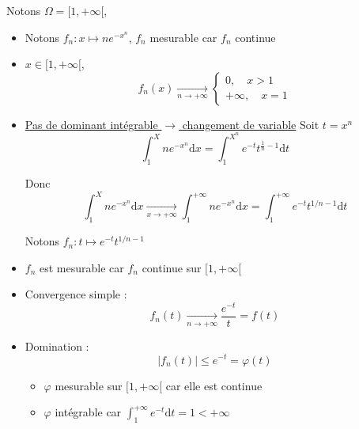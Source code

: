 \begin{solution}
Notons $\Omega = [1, + \infty[$, 
  \begin{itemize}

      \item Notons $f_n : x \mapsto n e ^{-x ^{n}}$, $f_n$ mesurable car $f_n$ continue 
      \item $x \in [1, + \infty[$, 
        \begin{equation}
          f_n(x)  \underset{n \to + \infty}{\longrightarrow} \begin{cases}
            0, \quad x>1 \\ 
            + \infty, \quad x = 1
          \end{cases}
        \end{equation}

      \item \underline{Pas de dominant intégrable $\to$ changement de variable} Soit $t = x ^{n}$
        \begin{equation}
           \int_{1}^{X} ne ^{-x ^{n}} \mathrm{d}x = \int_{1}^{X ^{n}} e ^{-t} t ^{\frac{1}{n} -1} \mathrm{d}t
        \end{equation}

      Donc 
      \begin{equation}
        \int_{1}^{X} ne ^{-x ^{n}} \mathrm{d}x  \underset{x \to + \infty}{\longrightarrow} \int_{1}^{+ \infty} ne ^{-x ^{n}} \mathrm{d}x = \int_{1}^{+ \infty} e ^{-t} t ^{1/n -1} \mathrm{d}t
      \end{equation}

      Notons $f_n : t \mapsto e ^{-t} t ^{1/n -1 }$

    \item $f_n$ est mesurable car $f_n$ continue sur $[1, + \infty[$ 
    \item Convergence simple : 
      \begin{equation}
        f_n(t)  \underset{n \to + \infty}{\longrightarrow}  \frac{e ^{-t}}{t}  = f(t)
      \end{equation}

    \item Domination : 
      \begin{equation}
        |f_n(t)| \le e ^{-t} = \varphi(t)
      \end{equation}

    \begin{itemize}

        \item $\varphi$ mesurable sur $[1, +\infty[$ car elle est continue 
        \item $\varphi$ intégrable car $\int_{1}^{+ \infty}e ^{-t} \mathrm{d}t = 1 < + \infty$ 



\end{itemize}
\end{itemize}
\end{solution}
